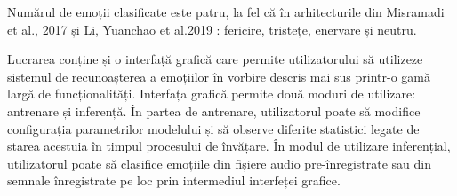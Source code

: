 \documentclass[a4paper,12pt]{book}
\begin{document}
					Numărul de emoții clasificate este patru, la fel că în arhitecturile din Misramadi et al., 2017 \cite{misramadi} și	Li, Yuanchao et al.2019 \cite{yuan}: fericire, tristețe, enervare și neutru. \par
					
					Lucrarea conține și o interfață grafică care permite utilizatorului să utilizeze sistemul de recunoașterea a emoțiilor în vorbire descris mai sus printr-o gamă largă de funcționalități. Interfața grafică permite două moduri de utilizare: antrenare și inferență. În partea de antrenare, utilizatorul poate să modifice configurația parametrilor modelului și să observe diferite statistici legate de starea acestuia în timpul procesului de învățare. În modul de utilizare inferențial, utilizatorul poate să clasifice emoțiile din fișiere audio pre-înregistrate sau din semnale înregistrate pe loc prin intermediul interfeței grafice.\par					
\end{document}
